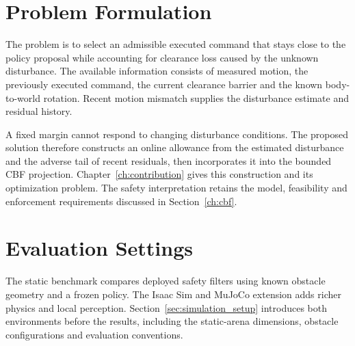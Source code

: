 \section{Problem Formulation}
The problem is to select an admissible executed command that stays close to the policy proposal while accounting for clearance loss caused by the unknown disturbance. The available information consists of measured motion, the previously executed command, the current clearance barrier and the known body-to-world rotation. Recent motion mismatch supplies the disturbance estimate and residual history.

A fixed margin cannot respond to changing disturbance conditions. The proposed solution therefore constructs an online allowance from the estimated disturbance and the adverse tail of recent residuals, then incorporates it into the bounded CBF projection. Chapter~\ref{ch:contribution} gives this construction and its optimization problem. The safety interpretation retains the model, feasibility and enforcement requirements discussed in Section~\ref{ch:cbf}.

\section{Evaluation Settings}
The static benchmark compares deployed safety filters using known obstacle geometry and a frozen policy. The Isaac Sim and MuJoCo extension adds richer physics and local perception. Section~\ref{sec:simulation_setup} introduces both environments before the results, including the static-arena dimensions, obstacle configurations and evaluation conventions.
